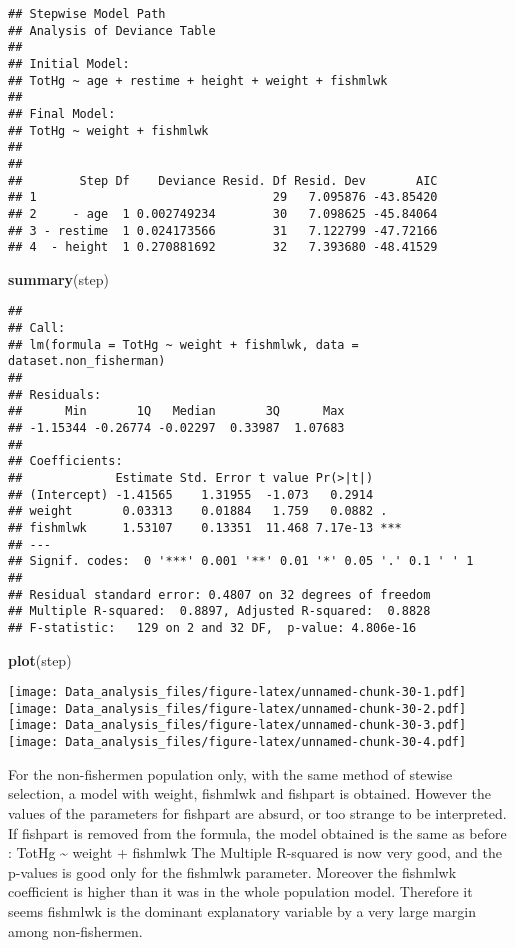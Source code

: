 \documentclass[12pt,]{article}
\newenvironment{Shaded}{\begin{snugshade}}{\end{snugshade}}
\newcommand{\KeywordTok}[1]{\textcolor[rgb]{0.13,0.29,0.53}{\textbf{#1}}}
\newcommand{\NormalTok}[1]{#1}
\begin{document}
\begin{verbatim}
## Stepwise Model Path 
## Analysis of Deviance Table
## 
## Initial Model:
## TotHg ~ age + restime + height + weight + fishmlwk
## 
## Final Model:
## TotHg ~ weight + fishmlwk
## 
## 
##        Step Df    Deviance Resid. Df Resid. Dev       AIC
## 1                                 29   7.095876 -43.85420
## 2     - age  1 0.002749234        30   7.098625 -45.84064
## 3 - restime  1 0.024173566        31   7.122799 -47.72166
## 4  - height  1 0.270881692        32   7.393680 -48.41529
\end{verbatim}

\begin{Shaded}
\begin{Highlighting}[]
\KeywordTok{summary}\NormalTok{(step)}
\end{Highlighting}
\end{Shaded}

\begin{verbatim}
## 
## Call:
## lm(formula = TotHg ~ weight + fishmlwk, data = dataset.non_fisherman)
## 
## Residuals:
##      Min       1Q   Median       3Q      Max 
## -1.15344 -0.26774 -0.02297  0.33987  1.07683 
## 
## Coefficients:
##             Estimate Std. Error t value Pr(>|t|)    
## (Intercept) -1.41565    1.31955  -1.073   0.2914    
## weight       0.03313    0.01884   1.759   0.0882 .  
## fishmlwk     1.53107    0.13351  11.468 7.17e-13 ***
## ---
## Signif. codes:  0 '***' 0.001 '**' 0.01 '*' 0.05 '.' 0.1 ' ' 1
## 
## Residual standard error: 0.4807 on 32 degrees of freedom
## Multiple R-squared:  0.8897, Adjusted R-squared:  0.8828 
## F-statistic:   129 on 2 and 32 DF,  p-value: 4.806e-16
\end{verbatim}

\begin{Shaded}
\begin{Highlighting}[]
\KeywordTok{plot}\NormalTok{(step)}
\end{Highlighting}
\end{Shaded}

\texttt{[image: Data\_analysis\_files/figure-latex/unnamed-chunk-30-1.pdf]}
\texttt{[image: Data\_analysis\_files/figure-latex/unnamed-chunk-30-2.pdf]}
\texttt{[image: Data\_analysis\_files/figure-latex/unnamed-chunk-30-3.pdf]}
\texttt{[image: Data\_analysis\_files/figure-latex/unnamed-chunk-30-4.pdf]}

For the non-fishermen population only, with the same method of stewise
selection, a model with weight, fishmlwk and fishpart is obtained.
However the values of the parameters for fishpart are absurd, or too
strange to be interpreted. If fishpart is removed from the formula, the
model obtained is the same as before : TotHg \textasciitilde{} weight +
fishmlwk The Multiple R-squared is now very good, and the p-values is
good only for the fishmlwk parameter. Moreover the fishmlwk coefficient
is higher than it was in the whole population model. Therefore it seems
fishmlwk is the dominant explanatory variable by a very large margin
among non-fishermen.
\end{document}
